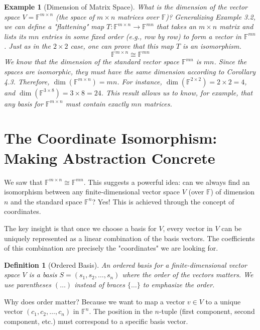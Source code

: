 \documentclass[11pt, letterpaper]{article}
\theoremstyle{mytheoremstyle}
\theoremstyle{mydefinitionstyle}
\newtheorem{definition}[theorem]{Definition}
\newtheorem{example}[theorem]{Example}
\theoremstyle{myremarkstyle}
\newcommand{\F}{\mathbb{F}}
\DeclareMathOperator{\dimv}{dim} %
\begin{document}
\begin{example}[Dimension of Matrix Space]
What is the dimension of the vector space $V = \F^{m \times n}$ (the space of $m \times n$ matrices over $\F$)?
Generalizing Example 3.2, we can define a "flattening" map $T: \F^{m \times n} \to \F^{mn}$ that takes an $m \times n$ matrix and lists its $mn$ entries in some fixed order (e.g., row by row) to form a vector in $\F^{mn}$. Just as in the $2 \times 2$ case, one can prove that this map $T$ is an isomorphism.
\[ \F^{m \times n} \cong \F^{mn} \]
We know that the dimension of the standard vector space $\F^{mn}$ is $mn$. Since the spaces are isomorphic, they must have the same dimension according to Corollary 4.3.
Therefore, $\dimv(\F^{m \times n}) = mn$.
For instance, $\dimv(\F^{2 \times 2}) = 2 \times 2 = 4$, and $\dimv(\F^{3 \times 8}) = 3 \times 8 = 24$.
This result allows us to know, for example, that any basis for $\F^{m \times n}$ must contain exactly $mn$ matrices.
\end{example}

\section{The Coordinate Isomorphism: Making Abstraction Concrete}

We saw that $\F^{m \times n} \cong \F^{mn}$. This suggests a powerful idea: can we always find an isomorphism between any finite-dimensional vector space $V$ (over $\F$) of dimension $n$ and the standard space $\F^n$? Yes! This is achieved through the concept of coordinates.

The key insight is that once we choose a basis for $V$, every vector in $V$ can be uniquely represented as a linear combination of the basis vectors. The coefficients of this combination are precisely the "coordinates" we are looking for.

\begin{definition}[Ordered Basis]
An \emph{ordered basis} for a finite-dimensional vector space $V$ is a basis $S = (s_1, s_2, \dots, s_n)$ where the order of the vectors matters. We use parentheses $( \dots )$ instead of braces $\{ \dots \}$ to emphasize the order.
\end{definition}
Why does order matter? Because we want to map a vector $v \in V$ to a unique vector $(c_1, c_2, \dots, c_n)$ in $\F^n$. The position in the $n$-tuple (first component, second component, etc.) must correspond to a specific basis vector.
\end{document}
